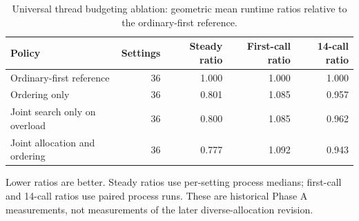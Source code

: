 \begin{table}[htbp]\centering
\small
\begin{tabular}{lrrrr}
\toprule
Policy & Settings & Steady ratio & First-call ratio & 14-call ratio \\
\midrule
Ordinary-first reference & 36 & 1.000 & 1.000 & 1.000 \\
Ordering only & 36 & 0.801 & 1.085 & 0.957 \\
Joint search only on overload & 36 & 0.800 & 1.085 & 0.962 \\
Joint allocation and ordering & 36 & 0.777 & 1.092 & 0.943 \\
\bottomrule
\end{tabular}
\caption{Universal thread budgeting ablation: geometric mean runtime ratios relative to the ordinary-first reference.}\label{tab:utb-ablation}
\par\medskip\begin{minipage}{0.98\linewidth}\footnotesize Lower ratios are better. Steady ratios use per-setting process medians; first-call and 14-call ratios use paired process runs. These are historical Phase A measurements, not measurements of the later diverse-allocation revision.\end{minipage}
\end{table}

